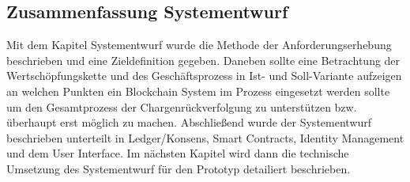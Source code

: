 
\subsection{Zusammenfassung Systementwurf}

Mit dem Kapitel Systementwurf wurde die Methode der Anforderungserhebung beschrieben und eine Zieldefinition gegeben. Daneben sollte eine Betrachtung der Wertschöpfungskette und des Geschäftsprozess in Ist- und Soll-Variante aufzeigen an welchen Punkten ein Blockchain System im Prozess eingesetzt werden sollte um den Gesamtprozess der Chargenrückverfolgung zu unterstützen bzw. überhaupt erst möglich zu machen. Abschließend wurde der Systementwurf beschrieben unterteilt in Ledger/Konsens, Smart Contracts, Identity Management und dem User Interface. Im nächsten Kapitel wird dann die technische Umsetzung des Systementwurf für den Prototyp detailiert beschrieben.

\newpage
